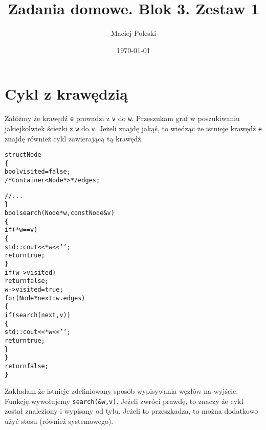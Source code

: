 \documentclass[a4paper,12pt]{article}
\title{Zadania domowe. Blok 3. Zestaw 1}
\author{Maciej Poleski}
\date{\today}
\begin{document}
\maketitle

\newpage

\section{Cykl z krawędzią}
Załóżmy że krawędź \verb|e| prowadzi z \verb|v| do \verb|w|. Przeszukam graf w poszukiwaniu jakiejkolwiek ścieżki z \verb|w| do \verb|v|. Jeżeli znajdę jakąś, to wiedząc że istnieje krawędź \verb|e| znajdę również cykl zawierającą tą krawędź.
\begin{alltt}
struct Node
\{
    bool visited=false;
    /* Container<Node*> */ edges;
    
    //...
\}
bool search(Node *w, const Node &v)
\{
    if(*w==v)
    \{
        std::cout<<*w<<' ';
        return true;
    \}
    if(w->visited)
        return false;
    w->visited=true;
    for(Node *next : w.edges)
    \{
        if(search(next,v))
        \{
            std::cout<<*w<<' ';
            return true;
        \}
    \}
    return false;
\}
\end{alltt}
Zakładam że istnieje zdefiniowany sposób wypisywania węzłów na wyjście. Funkcję wywołujemy \verb|search(&w,v)|. Jeżeli zwróci prawdę, to znaczy że cykl został znaleziony i wypisany od tyłu. Jeżeli to przeszkadza, to można dodatkowo użyć stosu (również systemowego).
\end{document}
